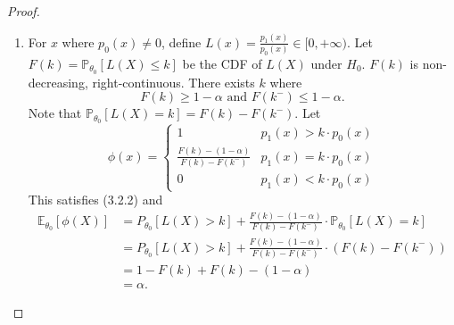 \documentclass[a4paper]{article}
\begin{document}
\begin{proof}
	\quad
	\begin{enumerate}
		\item For $x$ where $p_0(x) \neq 0$, define $L(x) = \frac{p_1(x)}{p_0(x)} \in [0,+\infty)$. Let $F(k) = \mathbb{P}_{\theta_0}[L(X) \leq k]$ be the CDF of $L(X)$ under $H_0$. $F(k)$ is non-decreasing, right-continuous. There exists $k$ where
		\begin{equation*}
			F(k) \geq 1-\alpha \text{ and } F(k^-) \leq 1-\alpha.
		\end{equation*} 
		Note that $\mathbb{P}_{\theta_0}[L(X) = k] = F(k) - F(k^-)$. Let
		\begin{equation}
			\phi (x) =\left\{ 
			\begin{array}{ll}
				1 & p_1(x) > k \cdot p_0(x) \\
				\frac{F(k) - (1-\alpha)}{F(k) - F(k^-)} & p_1(x) = k \cdot p_0(x) \\
				0 & p_1(x) < k \cdot p_0(x)
			\end{array} \right.
		\end{equation}
		This satisfies (3.2.2) and
		\begin{equation}
			\begin{aligned}
				\mathbb{E}_{\theta_0}[\phi(X)] &= P_{\theta_0}[L(X) > k] + \frac{F(k) -  (1-\alpha)}{F(k) - F(k^-)} \cdot \mathbb{P}_{\theta_0}[L(X) = k] \\
				&= P_{\theta_0}[L(X) > k] + \frac{F(k) -  (1-\alpha)}{F(k) - F(k^-)} \cdot (F(k) - F(k^-)) \\
				&= 1 - F(k) + F(k) - (1-\alpha) \\
				&= \alpha.
			\end{aligned}
		\end{equation}
		\begin{center}
\end{center}
\end{enumerate}
\end{proof}
\end{document}
